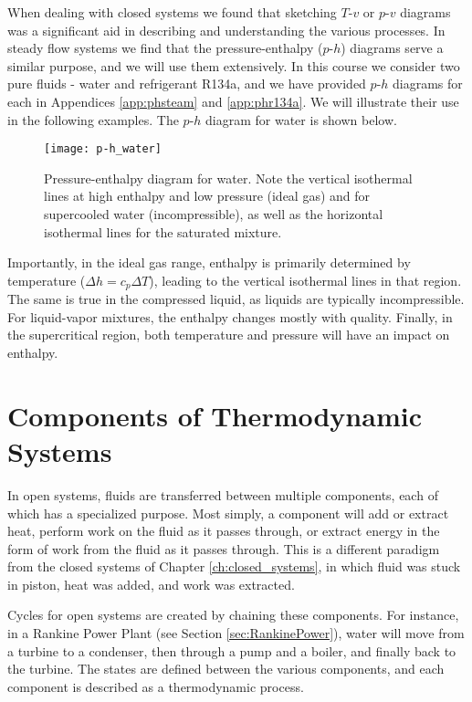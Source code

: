   When dealing with closed systems we found that sketching $T$-$v$ or $p$-$v$ diagrams was a significant aid in describing and understanding the various processes. In steady flow systems we find that the pressure-enthalpy ($p$-$h$) diagrams serve a similar purpose, and we will use them extensively. In this course we consider two pure fluids - water and refrigerant R134a, and we have provided $p$-$h$ diagrams for each in Appendices \ref{app:phsteam} and \ref{app:phr134a}. We will illustrate their use in the following examples. The $p$-$h$ diagram for water is shown below.

  
\begin{figure}[H]
\centering
\texttt{[image: p-h\_water]}
\caption{Pressure-enthalpy diagram for water.  Note the vertical isothermal lines at high enthalpy and low pressure (ideal gas) and for supercooled water (incompressible), as well as the horizontal isothermal lines for the saturated mixture.}
\label{fig:ch3_phWater}
\end{figure}

Importantly, in the ideal gas range, enthalpy is primarily determined by temperature ($\Delta h = c_p \Delta T$), leading to the vertical isothermal lines in that region.  The same is true in the compressed liquid, as liquids are typically incompressible.  For liquid-vapor mixtures, the enthalpy changes mostly with quality.  Finally, in the supercritical region, both temperature and pressure will have an impact on enthalpy.

\section{Components of Thermodynamic Systems}
In open systems, fluids are transferred between multiple components, each of which has a specialized purpose.  Most simply, a component will add or extract heat, perform work on the fluid as it passes through, or extract energy in the form of work from the fluid as it passes through.  This is a different paradigm from the closed systems of Chapter \ref{ch:closed_systems}, in which fluid was stuck in piston, heat was added, and work was extracted.

Cycles for open systems are created by chaining these components.  For instance, in a Rankine Power Plant (see Section \ref{sec:RankinePower}), water will move from a turbine to a condenser, then through a pump and a boiler, and finally back to the turbine.  The states are defined between the various components, and each component is described as a thermodynamic process.


